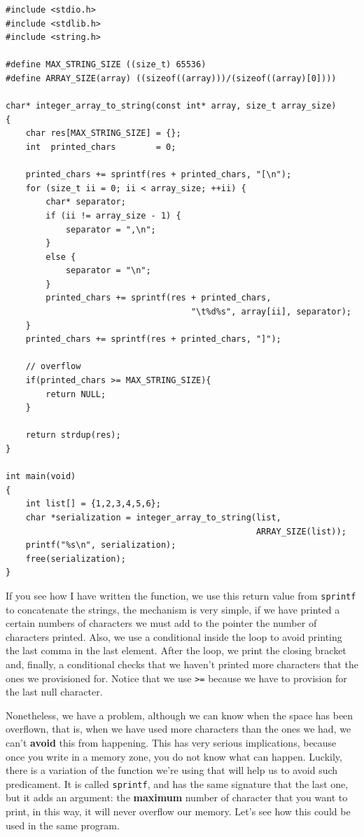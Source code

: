 \documentclass[a4paper]{article}
\begin{document}
\noindent
\begin{minipage}[H]{\linewidth}
\mbox{}
\begin{lstlisting}[style=C,
caption={Example of an advances use of \texttt{sprintf}},
label={lst:sprintfExample}]
#include <stdio.h>
#include <stdlib.h>
#include <string.h>

#define MAX_STRING_SIZE ((size_t) 65536)
#define ARRAY_SIZE(array) ((sizeof((array)))/(sizeof((array)[0])))

char* integer_array_to_string(const int* array, size_t array_size)
{
    char res[MAX_STRING_SIZE] = {};
    int  printed_chars        = 0;

    printed_chars += sprintf(res + printed_chars, "[\n");
    for (size_t ii = 0; ii < array_size; ++ii) {
        char* separator;
        if (ii != array_size - 1) {
            separator = ",\n";
        }
        else {
            separator = "\n";
        }
        printed_chars += sprintf(res + printed_chars,
                                     "\t%d%s", array[ii], separator);
    }
    printed_chars += sprintf(res + printed_chars, "]");

    // overflow
    if(printed_chars >= MAX_STRING_SIZE){
        return NULL;
    }

    return strdup(res);
}

int main(void)
{
    int list[] = {1,2,3,4,5,6};
    char *serialization = integer_array_to_string(list,
                                                  ARRAY_SIZE(list));
    printf("%s\n", serialization);
    free(serialization);
}
\end{lstlisting}
\end{minipage}

If you see how I have written the function, we use this return value from
\verb!sprintf! to concatenate the strings, the mechanism is very simple, if we
have printed a certain numbers of characters we must add to the pointer the
number of characters printed. Also, we use a conditional inside the loop to
avoid printing the last comma in the last element. After the loop, we print the
closing bracket and, finally, a conditional checks that we haven't printed more
characters that the ones we provisioned for. Notice that we use \verb!>=!
because we have to provision for the last null character.

Nonetheless, we have a problem, although we can know when the space has been
overflown, that is, when we have used more characters than the ones we had, we
can't \textbf{avoid} this from happening. This has very serious implications,
because once you write in a memory zone, you do not know what can happen.
Luckily, there is a variation of the function we're using that will help us to
avoid such predicament. It is called \verb!sprintf!, and has the same signature
that the last one, but it adds an argument: the \textbf{maximum} number of
character that you want to print, in this way, it will never overflow our
memory. Let's see how this could be used in the same program.
\end{document}

